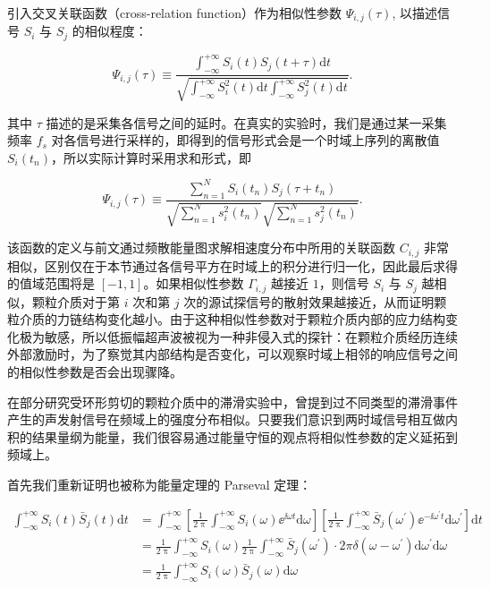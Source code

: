 引入交叉关联函数（cross-relation function）作为相似性参数 $\Psi_{i,j}(\tau)$, 以描述信号 $S_{i}$ 与 $S_{j}$ 的相似程度\cite{PhysRevLett.90.174302}：

\begin{equation}
  \Psi_{i,j}(\tau) \equiv \frac{\int_{-\infty}^{+\infty}S_{i}(t)S_{j}(t+\tau)\mathrm{d}t}{\sqrt{\int_{-\infty}^{+\infty}S_{i}^{2}(t)\mathrm{d}t\int_{-\infty}^{+\infty}S_{j}^{2}(t)\mathrm{d}t}}.
\end{equation}

其中 $\tau$ 描述的是采集各信号之间的延时。在真实的实验时，我们是通过某一采集频率 $f_{s}$ 对各信号进行采样的，即得到的信号形式会是一个时域上序列的离散值 $S_{i}(t_{n})$，所以实际计算时采用求和形式，即

\begin{equation}
  \Psi_{i,j}(\tau)\equiv \frac{\sum_{n=1}^{N}S_{i}(t_{n})S_{j}(\tau+t_{n})}{\sqrt{\sum_{n=1}^{N}s_{i}^{2}(t_{n})}\sqrt{\sum_{n=1}^{N}s_{j}^{2}(t_{n})}}.
\end{equation}

该函数的定义与前文通过频散能量图求解相速度分布中所用的关联函数 $C_{i,j}$ 非常相似，区别仅在于本节通过各信号平方在时域上的积分进行归一化，因此最后求得的值域范围将是 $[-1,1]$。如果相似性参数 $\Gamma_{i,j}$ 越接近 $1$，则信号 $S_{i}$ 与 $S_{j}$ 越相似，颗粒介质对于第 $i$ 次和第 $j$ 次的源试探信号的散射效果越接近，从而证明颗粒介质的力链结构变化越小。由于这种相似性参数对于颗粒介质内部的应力结构变化极为敏感，所以低振幅超声波被视为一种非侵入式的探针：在颗粒介质经历连续外部激励时，为了察觉其内部结构是否变化，可以观察时域上相邻的响应信号之间的相似性参数是否会出现骤降。

在部分研究受环形剪切的颗粒介质中的滞滑实验中，曾提到过不同类型的滞滑事件产生的声发射信号在频域上的强度分布相似\cite{doi:10.1073/pnas.2305134120}。只要我们意识到两时域信号相互做内积的结果量纲为能量，我们很容易通过能量守恒的观点将相似性参数的定义延拓到频域上。

首先我们重新证明也被称为能量定理的 Parseval 定理：

\begin{equation}
  \begin{aligned}
    \int_{-\infty}^{+\infty}S_{i}(t)\bar{S}_{j}(t)\mathrm{d}t &= \int_{-\infty}^{+\infty}\left[\frac{1}{2\uppi}\int_{-\infty}^{+\infty}S_{i}(\omega){\ee}^{\ii \omega t}\mathrm{d}\omega\right]\left[\frac{1}{2\uppi}\int_{-\infty}^{+\infty}\bar{S}_{j}(\omega^{\prime}){\ee}^{-\ii \omega^{\prime}t}\mathrm{d}\omega^{\prime}\right]\mathrm{d}t\\
    &= \frac{1}{2\uppi}\int_{-\infty}^{+\infty}S_{i}(\omega)\frac{1}{2\uppi}\int_{-\infty}^{+\infty}\bar{S}_{j}(\omega^{\prime})\cdot 2\pi\delta(\omega-\omega^{\prime})\mathrm{d}\omega^{\prime}\mathrm{d}\omega\\
    &= \frac{1}{2\uppi}\int_{-\infty}^{+\infty}S_{i}(\omega)\bar{S}_{j}(\omega)\mathrm{d}\omega
  \end{aligned}
\end{equation}

